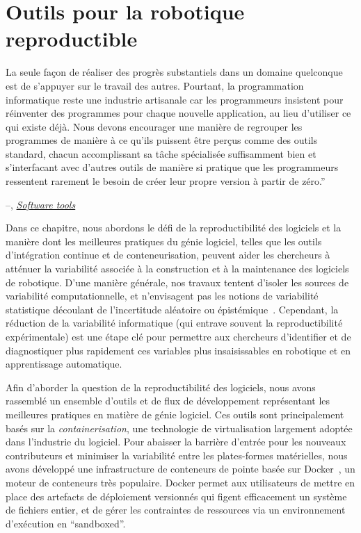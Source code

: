 \chapter{Outils pour la robotique reproductible}\label{ch:ducker}

\setlength{\epigraphwidth}{0.93\textwidth}
\epigraph{La seule façon de réaliser des progrès substantiels dans un domaine quelconque est de s'appuyer sur le travail des autres. Pourtant, la programmation informatique reste une industrie artisanale car les programmeurs insistent pour réinventer des programmes pour chaque nouvelle application, au lieu d'utiliser ce qui existe déjà. Nous devons encourager une manière de regrouper les programmes de manière à ce qu'ils puissent être perçus comme des outils standard, chacun accomplissant sa tâche spécialisée suffisamment bien et s'interfacant avec d'autres outils de manière si pratique que les programmeurs ressentent rarement le besoin de créer leur propre version à partir de zéro.''}{\begin{flushright}--\citet{kernighan1976software}, \href{https://dl.acm.org/doi/10.1145/1010726.1010728}{\textit{Software tools}}\end{flushright}}

Dans ce chapitre, nous abordons le défi de la reproductibilité des logiciels et la manière dont les meilleures pratiques du génie logiciel, telles que les outils d'intégration continue et de conteneurisation, peuvent aider les chercheurs à atténuer la variabilité associée à la construction et à la maintenance des logiciels de robotique. D'une manière générale, nos travaux tentent d'isoler les sources de variabilité computationnelle, et n'envisagent pas les notions de variabilité statistique découlant de l'incertitude aléatoire ou épistémique~\citep{diaz2018interactive}. Cependant, la réduction de la variabilité informatique (qui entrave souvent la reproductibilité expérimentale) est une étape clé pour permettre aux chercheurs d'identifier et de diagnostiquer plus rapidement ces variables plus insaisissables en robotique et en apprentissage automatique.

Afin d'aborder la question de la reproductibilité des logiciels, nous avons rassemblé un ensemble d'outils et de flux de développement représentant les meilleures pratiques en matière de génie logiciel. Ces outils sont principalement basés sur la \textit{containerisation}, une technologie de virtualisation largement adoptée dans l'industrie du logiciel. Pour abaisser la barrière d'entrée pour les nouveaux contributeurs et minimiser la variabilité entre les plates-formes matérielles, nous avons développé une infrastructure de conteneurs de pointe basée sur Docker~\citep{merkel2014docker}, un moteur de conteneurs très populaire. Docker permet aux utilisateurs de mettre en place des artefacts de déploiement versionnés qui figent efficacement un système de fichiers entier, et de gérer les contraintes de ressources via un environnement d'exécution en ``sandboxed''.


